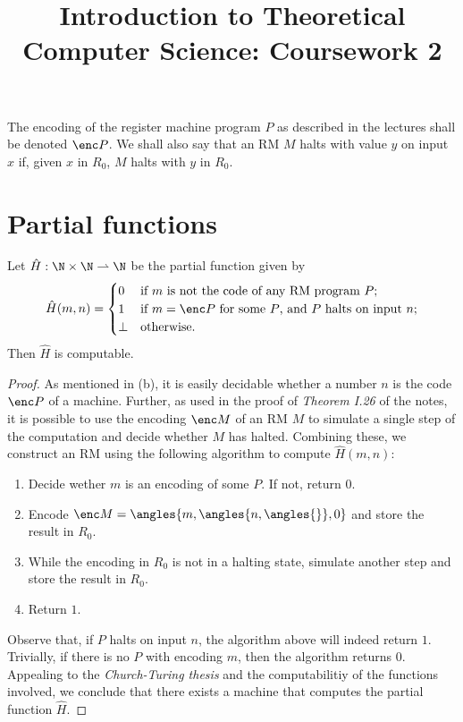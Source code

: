 \documentclass{article}
\title{Introduction to Theoretical Computer Science: Coursework 2}
\author{}
\begin{document}
\maketitle
\noindent The encoding of the register machine program $P$ as described in the lectures shall be denoted $\enc P$.
We shall also say that an RM $M$ halts with value $y$ on input $x$ if, given $x$ in $R_0$, $M$ halts
with $y$ in $R_0$.
\section{Partial functions}
\begin{claim*}[a, 1]
	Let $\hat H:\N\times\N\rightharpoonup\N$ be the partial function given by
	\begin{align*}
		\hat H(m,n)=\begin{cases}
			            0    & \text{if $m$ is not the code of any RM program $P$;}           \\
			            1    & \text{if $m=\enc P$ for some $P$, and $P$ halts on input $n$;} \\
			            \bot & \text{otherwise}.
		            \end{cases}
	\end{align*}
	Then $\hat H$ is computable.
	\begin{proof}
		As mentioned in (b), it is easily decidable whether a number $n$ is the code $\enc P$ of a
		machine. Further, as used in the proof of \emph{Theorem I.26} of the notes, it is possible
		to use the encoding $\enc M$ of an RM $M$ to simulate a single step of the computation and decide whether
		$M$ has halted. Combining these, we construct an RM using the following algorithm to compute
		$\hat H(m,n)$:
		\begin{enumerate}
			\item Decide wether $m$ is an encoding of some $P$. If not, return $0$.
			\item Encode $\enc M=\angles{m, \angles{n, \angles{}}, 0}$ and store the result in $R_0$.
			\item While the encoding in $R_0$ is not in a halting state, simulate another step and store the result in $R_0$.
			\item Return $1$.
		\end{enumerate}
		Observe that, if $P$ halts on input $n$, the algorithm above will indeed return $1$. Trivially,
		if there is no $P$ with encoding $m$, then the algorithm returns $0$.
		Appealing to the \emph{Church-Turing thesis} and the computabilitiy of the functions involved,
		we conclude that there exists a machine that computes the partial function $\hat H$.
	\end{proof}
\end{claim*}
\end{document}
